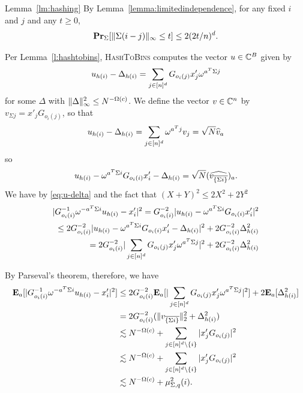 \begin{proofof}{Lemma~\ref{lm:hashing}}
  By Lemma~\ref{lemma:limitedindependence}, for any fixed $i$ and $j$ and any $t\geq 0$,
  \[
 \prob_{\Sigma}[\norm{\infty}{\Sigma(i-j)} \leq t] \leq 2(2t/n)^d.
  \]

 Per Lemma~\ref{l:hashtobins},
  \textsc{HashToBins} computes the vector $u \in \C^B$ given by
\begin{equation}\label{eq:u-delta}
  u_{h(i)} - \Delta_{h(i)} = \sum_{j\in \nsq} G_{o_i(j)}x'_j \omega^{a^T \Sigma j}
\end{equation}
  for some $\Delta$ with $\norm{\infty}{\Delta}^2 \leq  N^{-\Omega(c)}$.
  We define the vector $v \in \C^n$ by $v_{\Sigma j} = x'_j G_{o_i(j)}$, so that
  \[
  u_{h(i)} - \Delta_{h(i)} = \sum_{j\in \nsq} \omega^{a^Tj} v_j = \sqrt{N}\wh{v}_a
  \]
  so
  \[
  u_{h(i)} - \omega^{a^T\Sigma i}G_{o_i(i)}x'_i - \Delta_{h(i)} = \sqrt{N}(\wh{v_{\overline{\{\Sigma i\}}}})_a.
  \]
  We have by  \eqref{eq:u-delta} and the fact that $(X+Y)^2\leq 2X^2+2Y^2$ 
  \begin{equation*}
  \begin{split}
   \abs{G_{o_i(i)}^{-1}\omega^{-a^T\Sigma i}u_{h(i)} - x'_i}^2 =G_{o_i(i)}^{-2} \abs{u_{h(i)} - \omega^{a^T\Sigma i}G_{o_i(i)}x'_i}^2\\
    \leq 2G_{o_i(i)}^{-2} \abs{u_{h(i)} - \omega^{a^T\Sigma i}G_{o_i(i)}x'_i - \Delta_{h(i)}}^2 + 2G_{o_i(i)}^{-2}\Delta_{h(i)}^2\\    
    =2G_{o_i(i)}^{-2} \abs{\sum_{j\in \nsq} G_{o_i(j)}x'_j \omega^{a^T \Sigma j}}^2 +2G_{o_i(i)}^{-2} \Delta_{h(i)}^2\\        
  \end{split}
  \end{equation*}
  
  By Parseval's theorem, therefore, we have
  \begin{equation}\label{eq:a-est}
  \begin{split}
    \expect_a[\abs{G_{o_i(i)}^{-1}\omega^{-a^T\Sigma i}u_{h(i)} - x'_i}^2]
    &\leq 2G_{o_i(i)}^{-2} \expect_a[\abs{\sum_{j\in \nsq} G_{o_i(j)}x'_j \omega^{a^T \Sigma j}}^2] + 2\expect_a[\Delta_{h(i)}^2]\\
    &= 2G_{o_i(i)}^{-2} (\norm{2}{v_{\overline{\{\Sigma i\}}}}^2 + \Delta_{h(i)}^2)\\
    &\lesssim N^{-\Omega(c)} + \sum_{j\in \nsq \setminus \{i\}} \abs{x'_j G_{o_i(j)}}^2\\
    &\lesssim N^{-\Omega(c)} + \sum_{j \in \nsq \setminus \{i\}} \abs{x'_j G_{o_i(j)}}^2\\
    &\lesssim N^{-\Omega(c)} + \mu_{\Sigma, q}^2(i).\\
    \end{split}
  \end{equation}



\end{proofof}
